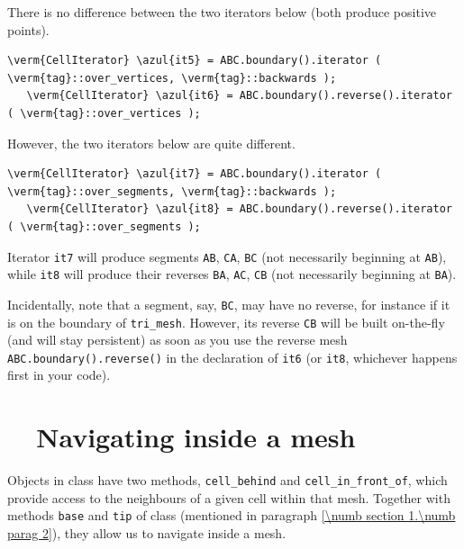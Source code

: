 There is no difference between the two iterators below (both produce positive
points).

\begin{Verbatim}[commandchars=\\\{\},formatcom=\small\tt,
   baselinestretch=0.94,framesep=2mm                      ]
   \verm{CellIterator} \azul{it5} = ABC.boundary().iterator ( \verm{tag}::over_vertices, \verm{tag}::backwards );
   \verm{CellIterator} \azul{it6} = ABC.boundary().reverse().iterator ( \verm{tag}::over_vertices );
\end{Verbatim}

However, the two iterators below are quite different.

\begin{Verbatim}[commandchars=\\\{\},formatcom=\small\tt,
   baselinestretch=0.94,framesep=2mm                      ]
   \verm{CellIterator} \azul{it7} = ABC.boundary().iterator ( \verm{tag}::over_segments, \verm{tag}::backwards );
   \verm{CellIterator} \azul{it8} = ABC.boundary().reverse().iterator ( \verm{tag}::over_segments );
\end{Verbatim}

Iterator {\small\tt it7} will produce segments {\small\tt AB}, {\small\tt CA}, {\small\tt BC}
(not necessarily beginning at {\small\tt AB}), while {\small\tt it8} will produce their reverses
{\small\tt BA}, {\small\tt AC}, {\small\tt CB} (not necessarily beginning at {\small\tt BA}).

Incidentally, note that a segment, say, {\small\tt BC}, may have no reverse,
for instance if it is on the boundary of {\small\tt tri\_mesh}.
However, its reverse {\small\tt CB} will be built on-the-fly (and will stay persistent)
as soon as you use the reverse mesh {\small\tt ABC.boundary().reverse()} in the declaration of
{\small\tt it6} (or {\small\tt it8}, whichever happens first in your code).


\section{~~Navigating inside a mesh}\label{\numb section 9.\numb parag 8}

Objects in class {\small\tt {}} have two methods, {\small\tt cell\_behind} and
{\small\tt cell\_in\_front\_of},
which provide access to the neighbours of a given cell within that mesh.
Together with methods {\small\tt base} and {\small\tt tip} of class {\small\tt {}}
(mentioned in paragraph \ref{\numb section 1.\numb parag 2}), they allow us to navigate inside
a mesh.

